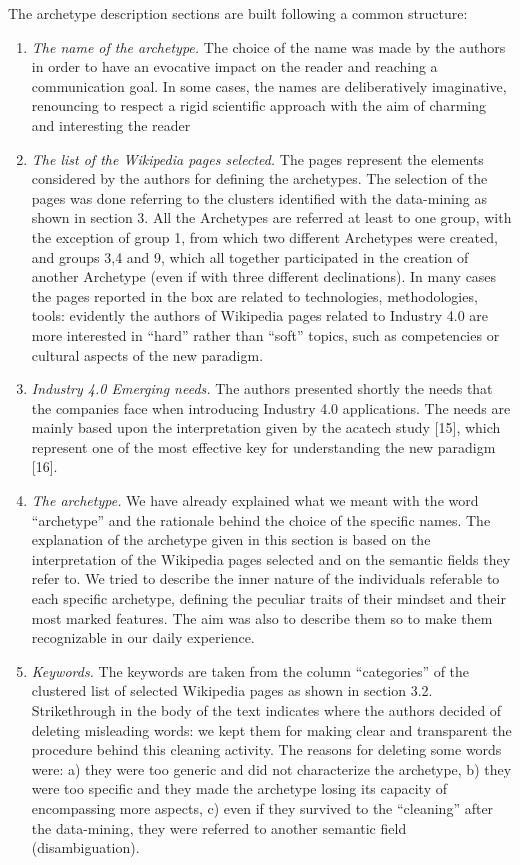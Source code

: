 \documentclass[]{book}
\begin{document}
The archetype description sections are built following a common
structure:

\begin{enumerate}
\def\labelenumi{\arabic{enumi}.}
\item
  \emph{The name of the archetype.} The choice of the name was made by
  the authors in order to have an evocative impact on the reader and
  reaching a communication goal. In some cases, the names are
  deliberatively imaginative, renouncing to respect a rigid scientific
  approach with the aim of charming and interesting the reader
\item
  \emph{The list of the Wikipedia pages selected.} The pages represent
  the elements considered by the authors for defining the archetypes.
  The selection of the pages was done referring to the clusters
  identified with the data-mining as shown in section 3. All the
  Archetypes are referred at least to one group, with the exception of
  group 1, from which two different Archetypes were created, and groups
  3,4 and 9, which all together participated in the creation of another
  Archetype (even if with three different declinations). In many cases
  the pages reported in the box are related to technologies,
  methodologies, tools: evidently the authors of Wikipedia pages related
  to Industry 4.0 are more interested in ``hard'' rather than ``soft''
  topics, such as competencies or cultural aspects of the new paradigm.
\item
  \emph{Industry 4.0 Emerging needs.} The authors presented shortly the
  needs that the companies face when introducing Industry 4.0
  applications. The needs are mainly based upon the interpretation given
  by the acatech study {[}15{]}, which represent one of the most
  effective key for understanding the new paradigm {[}16{]}.
\item
  \emph{The archetype.} We have already explained what we meant with the
  word ``archetype'' and the rationale behind the choice of the specific
  names. The explanation of the archetype given in this section is based
  on the interpretation of the Wikipedia pages selected and on the
  semantic fields they refer to. We tried to describe the inner nature
  of the individuals referable to each specific archetype, defining the
  peculiar traits of their mindset and their most marked features. The
  aim was also to describe them so to make them recognizable in our
  daily experience.
\item
  \emph{Keywords.} The keywords are taken from the column ``categories''
  of the clustered list of selected Wikipedia pages as shown in section
  3.2. Strikethrough in the body of the text indicates where the authors
  decided of deleting misleading words: we kept them for making clear
  and transparent the procedure behind this cleaning activity. The
  reasons for deleting some words were: a) they were too generic and did
  not characterize the archetype, b) they were too specific and they
  made the archetype losing its capacity of encompassing more aspects,
  c) even if they survived to the ``cleaning'' after the data-mining,
  they were referred to another semantic field (disambiguation).
\end{enumerate}
\end{document}
